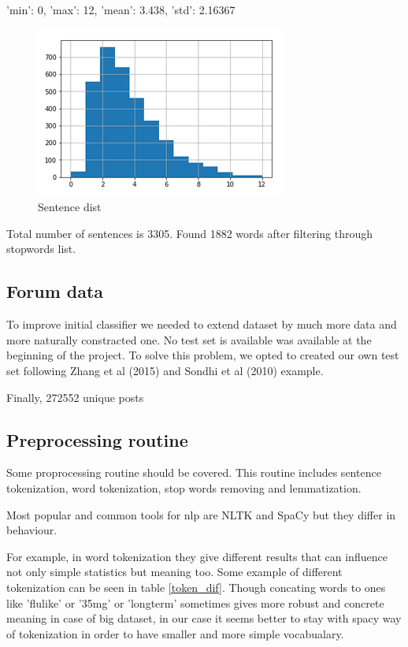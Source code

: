 \documentclass[11pt]{article}
\begin{document}
{'min': 0, 'max': 12, 'mean': 3.438, 'std': 2.16367}

 \begin{figure}[h]
 	\centering
 	\includegraphics[scale=0.4]{report4.png}
	\caption{Sentence dist}
 \label{words_freq}
 \end{figure}

Total number of sentences is 3305. Found 1882 words after filtering through stopwords list. 

\subsection{Forum data}

To improve initial classifier we needed to extend dataset by much more data and more naturally constracted one. No  test  set  is  available was available at the beginning of the project. To  solve this  problem,  we  opted  to  created  our  own  test set following Zhang et al (2015) and Sondhi et al (2010) example.  

Finally, 272552 unique posts


\subsection{Preprocessing routine}

Some proprocessing routine should be covered. This routine includes sentence tokenization, word tokenization, stop words removing and lemmatization. 

Most popular and common tools for nlp are NLTK and SpaCy but they differ in behaviour.


For example, in word tokenization they give different results that can influence not only simple statistics but meaning too. Some example of different tokenization can be seen in table \ref{token_dif}. Though concating words to ones like 'flulike' or '35mg' or 'longterm' sometimes gives more robust and concrete meaning in case of big dataset, in our case it seems better to stay with spacy way of tokenization in order to have smaller and more simple vocabualary.
\end{document}
